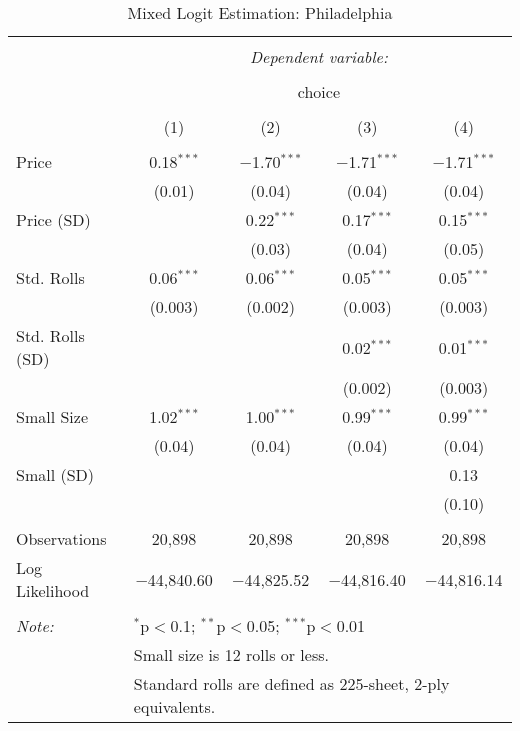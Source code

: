 
\begin{table}[!htbp] \centering 
  \caption{Mixed Logit Estimation: Philadelphia} 
  \label{tab:mnlPhiladelphiaRandCoefNoObsHet} 
\begin{tabular}{@{\extracolsep{5pt}}lcccc} 
\\[-1.8ex]\hline 
\hline \\[-1.8ex] 
 & \multicolumn{4}{c}{\textit{Dependent variable:}} \\ 
\cline{2-5} 
\\[-1.8ex] & \multicolumn{4}{c}{choice} \\ 
\\[-1.8ex] & (1) & (2) & (3) & (4)\\ 
\hline \\[-1.8ex] 
 Price & 0.18$^{***}$ & $-$1.70$^{***}$ & $-$1.71$^{***}$ & $-$1.71$^{***}$ \\ 
  & (0.01) & (0.04) & (0.04) & (0.04) \\ 
  Price (SD) &  & 0.22$^{***}$ & 0.17$^{***}$ & 0.15$^{***}$ \\ 
  &  & (0.03) & (0.04) & (0.05) \\ 
  Std. Rolls & 0.06$^{***}$ & 0.06$^{***}$ & 0.05$^{***}$ & 0.05$^{***}$ \\ 
  & (0.003) & (0.002) & (0.003) & (0.003) \\ 
  Std. Rolls (SD) &  &  & 0.02$^{***}$ & 0.01$^{***}$ \\ 
  &  &  & (0.002) & (0.003) \\ 
  Small Size & 1.02$^{***}$ & 1.00$^{***}$ & 0.99$^{***}$ & 0.99$^{***}$ \\ 
  & (0.04) & (0.04) & (0.04) & (0.04) \\ 
  Small (SD) &  &  &  & 0.13 \\ 
  &  &  &  & (0.10) \\ 
 \hline \\[-1.8ex] 
Observations & 20,898 & 20,898 & 20,898 & 20,898 \\ 
Log Likelihood & $-$44,840.60 & $-$44,825.52 & $-$44,816.40 & $-$44,816.14 \\ 
\hline 
\hline \\[-1.8ex] 
\textit{Note:}  & \multicolumn{4}{l}{$^{*}$p$<$0.1; $^{**}$p$<$0.05; $^{***}$p$<$0.01} \\ 
 & \multicolumn{4}{l}{Small size is 12 rolls or less.} \\ 
 & \multicolumn{4}{l}{Standard rolls are defined as 225-sheet, 2-ply equivalents.} \\ 
\end{tabular} 
\end{table} 
